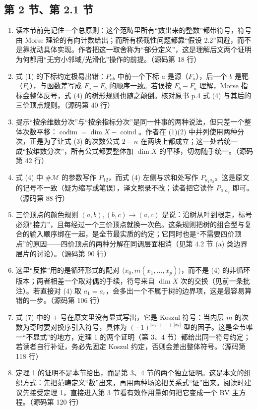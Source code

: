 \subsection*{第 2 节、第 2.1 节}
\begin{enumerate}
  \item 读本节前先记住一个总原则：这个范畴里所有“数出来的整数”都带符号，符号由 Morse 理论的有向计数给出；而所有横截性问题都靠“假设 2.2”回避，而不是靠扰动具体实现。作者把这一取舍称为“部分定义”，这是理解后文两个证明为何都用“无穷小邻域/光滑化”操作的前提。\hfill{\footnotesize （源码第 18 行）}
  \item 式 (1) 的下标约定极易出错：$P_{ab}$ 中前一个下标 $a$ 是源（$F_a$），后一个 $b$ 是靶（$F_b$），与函数差写成 $F_a-F_b$ 的顺序一致。若误按 $F_b-F_a$ 理解，Morse 指标会整体反号，式 (4) 的树形规则也随之颠倒。核对原书 p.4 式 (4) 与其后的三价顶点规则。\hfill{\footnotesize （源码第 40 行）}
  \item 提示“按余维数分次”与“按余指标分次”是同一件事的两种说法，但只差一个整体次数平移：$\operatorname{codim}=\dim X-\operatorname{coind}$。作者在 (1)(2) 中并列使用两种分次，正是为了让式 (3) 的次数公式 $2-n$ 在两块上都成立；这一处若统一成“按维数分次”，所有公式都要整体加 $\dim X$ 的平移，切勿随手统一。\hfill{\footnotesize （源码第 42 行）}
  \item 式 (4) 中 $\#\mathcal M$ 的参数写作 $P_{12}$，而式 (4) 左侧与求和处写作 $P_{a_1a_2}$。这是原文的记号不一致（疑为缩写或笔误），译文照录不改；读者把它读作 $P_{a_1a_2}$ 即可。\hfill{\footnotesize （源码第 88 行）}
  \item 三价顶点的颜色规则 $(a,b),(b,c)\to(a,c)$ 是说：沿树从叶到根走，标号必须“接力”，且每经过一个三价顶点就换一次色。这条规则把树的组合型与复合的输入顺序绑在一起，是全节最实质的约定；它同时也是“不需要四价顶点”的原因——四价顶点的两种分解在同调层面相消（见第 4.2 节 (a) 类边界层片的讨论）。\hfill{\footnotesize （源码第 90 行）}
  \item 这里“反推”用的是循环形式的配对 $\langle x_0,m(x_1,\dots,x_p)\rangle$，而不是 (4) 的非循环版本；两者相差一个取对偶的手续，符号来自 $\dim X$ 次的交换（见前一条批注）。若直接对 (4) 取 $a_1=a_r$，会多出一个不属于树的边界项，这是最容易算错的一步。\hfill{\footnotesize （源码第 106 行）}
  \item 式 (7) 中的 $\pm$ 号在原文里没有显式写出，它是 Koszul 符号：当内层 $m$ 的次数为奇时要对换序引入符号，具体为 $(-1)^{|x_1|+\cdots+|x_r|}$ 型的因子。这是全节唯一“不显式”的地方，定理 1 的两个证明（第 3、4 节）都给出同一符号约定；若读者自行补证，务必先固定 Koszul 约定，否则会差出整体符号。\hfill{\footnotesize （源码第 118 行）}
  \item 定理 1 的证明不是本节给出，而是第 3、4 节的两个独立证明。这是本文的组织方式：先把范畴定义“数”出来，再用两种场论把关系式“证”出来。阅读时建议先接受定理 1，直接进入第 3 节看有效作用量如何把它变成一个 BV 主方程。\hfill{\footnotesize （源码第 120 行）}
\end{enumerate}

